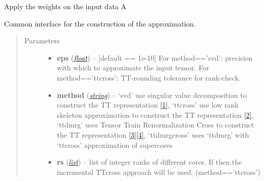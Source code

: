 \documentclass[a4paper,10pt,english]{sphinxmanual}
\begin{document}
\begin{fulllineitems}
\begin{quote}
\begin{description}
\begin{itemize}
\end{itemize}

\end{description}\end{quote}

\begin{fulllineitems}
\label{api-wttvec:TensorToolbox.core.WTTvec.apply_weights_on_data}
Apply the weights on the input data A

\end{fulllineitems}


\begin{fulllineitems}
\label{api-wttvec:TensorToolbox.core.WTTvec.build}
Common interface for the construction of the approximation.
\begin{quote}\begin{description}
\item[{Parameters}] \leavevmode\begin{itemize}
\item {} 
\textbf{eps} (\href{http://docs.python.org/library/functions.html\#float}{\emph{float}}) -- {[}default == 1e-10{]} For method=='svd': precision with which to approximate the input tensor. For method=='ttcross': TT-rounding tolerance for rank-check.

\item {} 
\textbf{method} (\href{http://docs.python.org/library/string.html\#module-string}{\emph{string}}) -- `svd' use singular value decomposition to construct the TT representation {\hyperref[zrefs:oseledets2011]{{[}1{]}}}, `ttcross' use low rank skeleton approximation to construct the TT representation {\hyperref[zrefs:oseledets2010]{{[}2{]}}}, `ttdmrg' uses Tensor Train Renormalization Cross to construct the TT representation {\hyperref[zrefs:savostyanov2011]{{[}3{]}}}{\hyperref[zrefs:savostyanov2013]{{[}4{]}}}, `ttdmrgcross' uses `ttdmrg' with `ttcross' approximation of supercores

\item {} 
\textbf{rs} (\href{http://docs.python.org/library/functions.html\#list}{\emph{list}}) -- list of integer ranks of different cores. If  then the incremental TTcross approach will be used. (method=='ttcross')


\end{itemize}
\end{description}
\end{quote}
\end{fulllineitems}
\end{fulllineitems}
\end{document}
